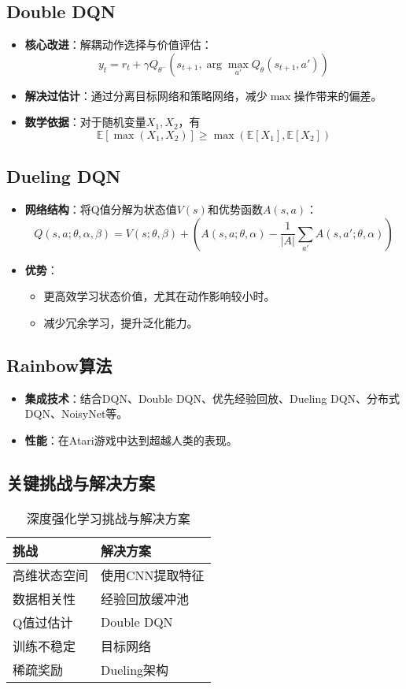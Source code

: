 \subsection{Double DQN}
\begin{itemize}
    \item \textbf{核心改进}：解耦动作选择与价值评估：
    \[
    y_t = r_t + \gamma Q_{\theta^-}(s_{t+1}, \arg\max_{a'} Q_\theta(s_{t+1}, a'))
    \]
    \item \textbf{解决过估计}：通过分离目标网络和策略网络，减少\(\max\)操作带来的偏差。
    \item \textbf{数学依据}：对于随机变量\(X_1, X_2\)，有
    \[
    \mathbb{E}[\max(X_1, X_2)] \geq \max(\mathbb{E}[X_1], \mathbb{E}[X_2])
    \]
\end{itemize}

\subsection{Dueling DQN}
\begin{itemize}
    \item \textbf{网络结构}：将Q值分解为状态值\(V(s)\)和优势函数\(A(s,a)\)：
    \[
    Q(s,a; \theta, \alpha, \beta) = V(s; \theta, \beta) + \left( A(s,a; \theta, \alpha) - \frac{1}{|A|}\sum_{a'} A(s,a'; \theta, \alpha) \right)
    \]
    \item \textbf{优势}：
    \begin{itemize}
        \item 更高效学习状态价值，尤其在动作影响较小时。
        \item 减少冗余学习，提升泛化能力。
    \end{itemize}
\end{itemize}

\subsection{Rainbow算法}
\begin{itemize}
    \item \textbf{集成技术}：结合DQN、Double DQN、优先经验回放、Dueling DQN、分布式DQN、NoisyNet等。
    \item \textbf{性能}：在Atari游戏中达到超越人类的表现。
\end{itemize}

\subsection{关键挑战与解决方案}
\begin{table}[H] %
\centering
\caption{深度强化学习挑战与解决方案}
\begin{tabular}{ll}
\toprule
\textbf{挑战} & \textbf{解决方案} \\
\midrule
高维状态空间 & 使用CNN提取特征 \\
数据相关性 & 经验回放缓冲池 \\
Q值过估计 & Double DQN \\
训练不稳定 & 目标网络 \\
稀疏奖励 & Dueling架构 \\
\bottomrule
\end{tabular}
\end{table}

